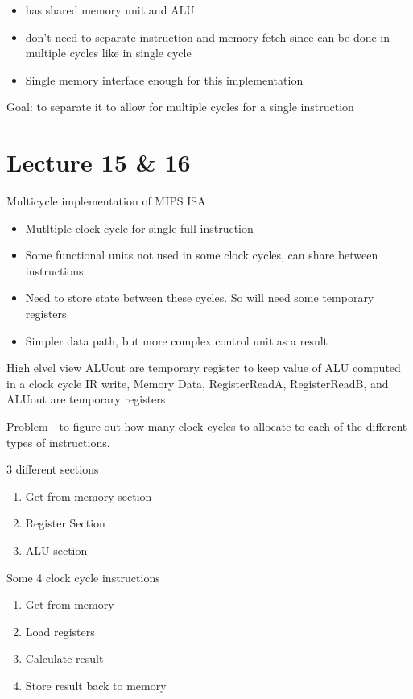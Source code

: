 \documentclass{article}
\begin{document}
		\begin{itemize}
			\item has shared memory unit and ALU
			\item don't need to separate instruction and memory fetch since can be done in multiple cycles like in single cycle
			\item Single memory interface enough for this implementation
		\end{itemize}

			Goal: to separate it to allow for multiple cycles for a single instruction

\section{Lecture 15 \& 16}
	Multicycle implementation of MIPS ISA
		\begin{itemize}
			\item Mutltiple clock cycle for single full instruction
			\item Some functional units not used in some clock cycles, can share between instructions
			\item Need to store state between these cycles. So will need some temporary registers
			\item Simpler data path, but more complex control unit as a result
		\end{itemize}

	High elvel view
		ALUout are temporary register to keep value of ALU computed in a clock cycle
		IR write, Memory Data, RegisterReadA, RegisterReadB, and ALUout are temporary registers
		
		Problem - to figure out how many clock cycles to allocate to each of the different types of instructions.

		3 different sections 
		\begin{enumerate}
			\item Get from memory section
			\item Register Section
			\item ALU section
		\end{enumerate}

		Some 4 clock cycle instructions
		\begin{enumerate}
			\item Get from memory
			\item Load registers
			\item Calculate result
			\item Store result back to memory
		\end{enumerate}
\end{document}
